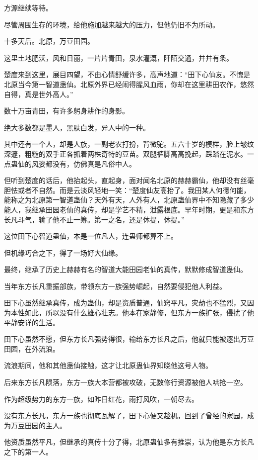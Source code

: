 \begin{this_body}
方源继续等待。

尽管周围生存的环境，给他施加越来越大的压力，但他仍旧不为所动。

十多天后。北原，万豆田园。

这里土地肥沃，风和日丽，一片片青田，泉水灌溉，阡陌交通，井井有条。

楚度来到这里，展目四望，不由心情舒缓许多，高声地道：“田下心仙友。不愧是北原当今第一智道蛊仙。北原外界已经闹得腥风血雨，你却在这里耕田农作，悠然自得，真是世外高人。”

数十万亩青田，有许多躬身耕作的身影。

绝大多数都是墨人，黑肤白发，异人中的一种。

其中还有一个人，却是人族，一副老农打扮，背微驼。五六十岁的模样，脸上皱纹深邃，粗糙的双手正各抓着两株奇特的豆苗。双腿裤脚高高挽起，踩踏在泥水。一点蛊仙的风姿都没有，仿佛真是凡俗中人。

但听到楚度的话后，他抬起头，直起身，面对闻名北原的赫赫霸仙，他却没有丝毫胆怯或者不自然。而是云淡风轻地一笑：“楚度仙友高抬了。我田某人何德何能，能称之为北原第一智道蛊仙？天外有天，人外有人，北原蛊仙界中不知隐藏了多少能人，我继承田园老仙的真传，却是学艺不精，泄露根底。早年时期，更是和东方长凡斗气，输了他不止一筹。第一之名，还是休提，休提。”

这位田下心智道蛊仙，本是一位凡人，连蛊师都算不上。

但机缘巧合之下，得了一场好大仙缘。

最终，继承了历史上赫赫有名的智道大能田园老仙的真传，默默修成智道蛊仙。

当年东方长凡重振部族，带领东方一族强势崛起，自然要侵犯他人利益。

田下心虽然继承真传，成为蛊仙，却是资质普通，仙窍平凡，灾劫也不猛烈，又因为本性如此，所以没有什么雄心壮志。他本在家静修，但东方一族扩张，侵扰了他平静安详的生活。

田下心虽然不愿，但东方长凡强势得很，输给东方长凡之后，他就只能被逐出万豆田园，在外流浪。

流浪期间，他和其他蛊仙接触，这才让北原蛊仙界知晓他这号人物。

后来东方长凡陨落，东方一族大本营都被攻破，无数修行资源被他人哄抢一空。

作为超级势力的东方一族，如昨日红花，雨打风吹，一朝尽去。

没有东方长凡，东方一族也彻底瓦解了，田下心便又趁机，回到了曾经的家园，成为万豆田园的主人。

他资质虽然平凡，但继承的真传十分了得，北原蛊仙多有推崇，认为他是东方长凡之下的第一人。


\end{this_body}
